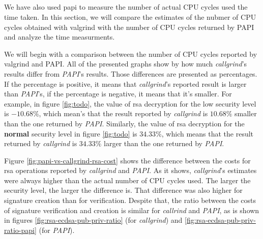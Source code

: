 \documentclass{llncs}
\begin{document}
\subsection{}

We have also used \gls{papi} to measure the number of actual CPU cycles used the time taken. In this section, we will compare the estimates
of the nubmer of CPU cycles obtained with valgrind with the number of CPU cycles returned by PAPI and analyze the time measurments.

We will begin with a comparison between the number of CPU cycles reported by valgrind and PAPI. All of the presented graphs
show by how much \textit{callgrind}'s results differ from \textit{PAPI}'s results. Those differences are presented as
percentages. If the percentage is positive, it means that \textit{callgrind}'s reported result is larger than \textit{PAPI}'s,
if the percentage is negative, it means that it's smaller. For example, in figure \ref{fig:todo}, the value of \gls{rsa} decryption
for the low security level is $-10.68\%$, which mean's that the result reported by \textit{callgrind} is $10.68\%$ smaller than the one
returned by \textit{PAPI}. Similarly, the value of \gls{rsa} decryption for the \textbf{normal} security level in figure \ref{fig:todo}
is $34.33\%$, which means that the result returned by \textit{callgrind} is $34.33\%$ larger than the one returned by \textit{PAPI}.


Figure \ref{fig:papi-vs-callgrind-rsa-cost} shows the difference between the costs for \gls{rsa} operations reported by \textit{callgrind} 
and \textit{PAPI}.
As it shows, \textit{callgrind}'s estimates were always higher than the actual number of CPU cycles used. The larger the security
level, the larger the difference is. That difference was also higher for signature creation than for verification. Despite that, 
the ratio between the costs of signature verification and creation is similar for \textit{callrind} and \textit{PAPI}, as is shown in
figures \ref{fig:rsa-ecdsa-pub-priv-ratio} (for \textit{callgrind}) and \ref{fig:rsa-ecdsa-pub-priv-ratio-papi} (for \textit{PAPI}).
\end{document}
